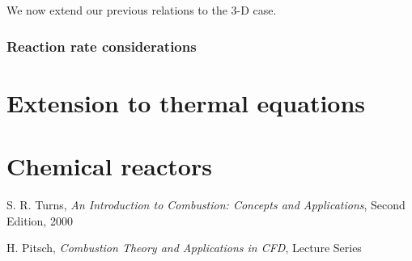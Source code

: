 \documentclass[10pt,twocolumn]{article}
\begin{document}
We now extend our previous relations to the 3-D case.

\subsubsection{Reaction rate considerations}











\section{Extension to thermal equations}




\section{Chemical reactors}








\thebibliography{}

 S. R. Turns, \textit{An Introduction to Combustion: Concepts and Applications}, Second Edition, 2000 \label{bib:turns}

 H. Pitsch, \textit{Combustion Theory and Applications in CFD}, Lecture Series \label{bib:pitsch}


 \label{bib:pope}
\end{document}
